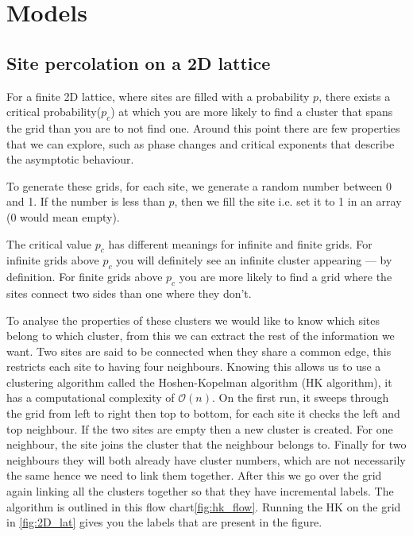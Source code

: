 \documentclass[%
 reprint,
 amsmath,amssymb,
 aps,
]{revtex4-2}
\begin{document}
\section{Models}\label{sec:models}
\subsection{Site percolation on a 2D lattice}\label{sec:site}
For a finite 2D lattice, where sites are filled with a probability $p$, there exists a critical probability($p_{c}$) at which you are more likely to find a cluster that spans the grid than you are to not find one. Around this point there are few properties that we can explore, such as phase changes and critical exponents that describe the asymptotic behaviour.

To generate these grids, for each site, we generate a random number between 0 and 1. If the number is less than $p$, then we fill the site i.e. set it to 1 in an array (0 would mean empty).

The critical value $p_{c}$ has different meanings for infinite and finite grids. For infinite grids above $p_{c}$ you will definitely see an infinite cluster appearing --- by definition. For finite grids above $p_{c}$ you are more likely to find a grid where the sites connect two sides than one where they don't.

To analyse the properties of these clusters we would like to know which sites belong to which cluster, from this we can extract the rest of the information we want. Two sites are said to be connected when they share a common edge, this restricts each site to having four neighbours. Knowing this allows us to use a clustering algorithm called the Hoshen-Kopelman algorithm \cite{hoshen_percolation_1976} (HK algorithm), it has a computational complexity of $\mathcal{O}(n)$. 
On the first run, it sweeps through the grid from left to right then top to bottom, for each site it checks the left and top neighbour. If the two sites are empty then a new cluster is created. For one neighbour, the site joins the cluster that the neighbour belongs to. Finally for two neighbours they will both already have cluster numbers, which are not necessarily the same hence we need to link them together. After this we go over the grid again linking all the clusters together so that they have incremental labels. The algorithm is outlined in this flow chart\cref{fig:hk_flow}. Running the HK on the grid in \cref{fig:2D_lat} gives you the labels that are present in the figure.
\end{document}
